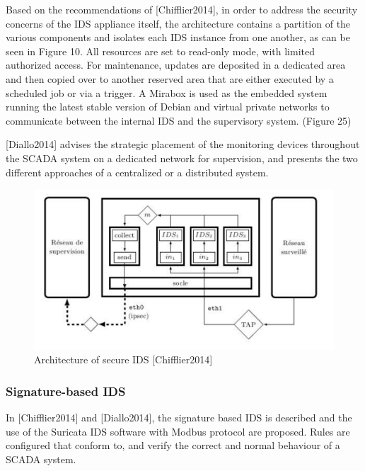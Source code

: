 \documentclass[12pt,]{article}
\begin{document}
Based on the recommendations of {[}Chifflier2014{]}, in order to address
the security concerns of the IDS appliance itself, the architecture
contains a partition of the various components and isolates each IDS
instance from one another, as can be seen in Figure 10. All resources
are set to read-only mode, with limited authorized access. For
maintenance, updates are deposited in a dedicated area and then copied
over to another reserved area that are either executed by a scheduled
job or via a trigger. A Mirabox is used as the embedded system running
the latest stable version of Debian and virtual private networks to
communicate between the internal IDS and the supervisory system. (Figure
25)

{[}Diallo2014{]} advises the strategic placement of the monitoring
devices throughout the SCADA system on a dedicated network for
supervision, and presents the two different approaches of a centralized
or a distributed system.

\begin{figure}

{\centering \includegraphics{thesis_files/figure-latex/unnamed-chunk-38-1} 

}

\caption{Architecture of secure IDS [Chifflier2014]}\label{fig:unnamed-chunk-38}
\end{figure}

\subsubsection{Signature-based IDS}\label{signature-based-ids}

In {[}Chifflier2014{]} and {[}Diallo2014{]}, the signature based IDS is
described and the use of the Suricata IDS software with Modbus protocol
are proposed. Rules are configured that conform to, and verify the
correct and normal behaviour of a SCADA system.
\end{document}
